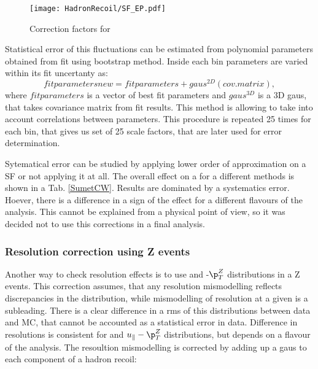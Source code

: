 \begin{figure}[t]
\centering
\texttt{[image: HadronRecoil/SF\_EP.pdf]}
\caption{Correction factors for \wenu}
\label{SFWplusenu}
\end{figure}

Statistical error of this fluctuations can be estimated from polynomial parameters obtained from fit using bootstrap method. Inside each bin parameters are varied within its fit uncertanty as:
\begin{equation}
fit parameters new = fit parameters + gaus^{2D}(cov.matrix),
\end{equation}
where $fit parameters$  is a vector of best fit parameters and $gaus^{3D}$ is a 3D gaus, that takes covariance matrix from fit results. This method is allowing to take into account correlations between parameters. This procedure is repeated 25 times for each bin, that gives us set of 25 scale factors, that are later used for error determination.

Sytematical error can be studied by applying lower order of approximation on a SF or not applying it at all. The overall effect on a \cw for a different methods is shown in a Tab. \ref{SumetCW}. Results are dominated by a systematics error. Hoever, there is a difference in a sign of the effect for a different flavours of the analysis. This cannot be explained from a physical point of view, so it was decided not to use this corrections in a final analysis.
 
\begin{figure}[h]
\begin{minipage}[h]{0.49\linewidth}
\end{minipage}
\hfill
\begin{minipage}[h]{0.49\linewidth}
\end{minipage}
\caption{}
\label{HadrRecoil:PtSpectrum}
\end{figure}

\subsubsection{Resolution correction using Z events}
Another way to check resolution effects is to use \uperp and \upar-$\p_T^{Z}$ distributions in a Z events. This correction assumes, that any resolution mismodelling reflects discrepancies in the \sumet distribution, while mismodelling of resolution at a given \sumet is a subleading. There is a clear difference in a rms of this distributions between data and MC, that cannot be accounted as a statistical error in data. Difference in resolutions is consistent for \uperp and $\upar- \p_T^{Z}$ distributions, but depends on a flavour of the analysis.  The resoultion mismodelling is corrected by adding up a gaus to each component of a hadron recoil:

